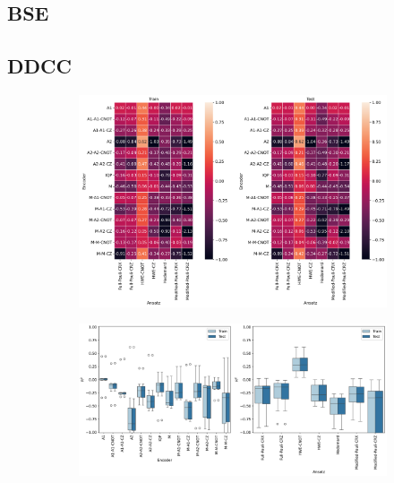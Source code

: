\documentclass[journal=jacsat,manuscript=article]{achemso}
\begin{document}
\begin{figure}[H]
\begin{subfigure}[b]{0.49\textwidth}
		\caption{}
		\label{fig:sine_learning_curves}
	\end{subfigure}	
	\caption{}
	\label{fig:functionfitting_learning_curves}	
\end{figure}


\subsection{BSE}

\subsection{DDCC}




\begin{figure}[H]
	\centering	
	\begin{subfigure}[b]{0.49\textwidth}
		\centering
		\includegraphics[width=\linewidth]{../images/DDCC/DDCC_heatplots}
		\caption{}
		\label{fig:ddccheatplots}
	\end{subfigure}
	\hfill	
	\begin{subfigure}[b]{0.49\textwidth}
		\centering
		\includegraphics[width=\linewidth]{../images/DDCC/DDCC_boxplots}

\end{subfigure}
\end{figure}
\end{document}
